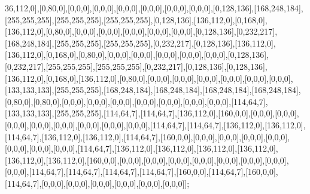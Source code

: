 36,112,0],[0,80,0],[0,0,0],[0,0,0],[0,0,0],[0,0,0],[0,0,0],[0,0,0],[0,128,136],[168,248,184],[255,255,255],[255,255,255],[255,255,255],[0,128,136],[136,112,0],[0,168,0],[136,112,0],[0,80,0],[0,0,0],[0,0,0],[0,0,0],[0,0,0],[0,0,0],[0,128,136],[0,232,217],[168,248,184],[255,255,255],[255,255,255],[0,232,217],[0,128,136],[136,112,0],[136,112,0],[0,168,0],[0,80,0],[0,0,0],[0,0,0],[0,0,0],[0,0,0],[0,0,0],[0,128,136],[0,232,217],[255,255,255],[255,255,255],[0,232,217],[0,128,136],[0,128,136],[136,112,0],[0,168,0],[136,112,0],[0,80,0],[0,0,0],[0,0,0],[0,0,0],[0,0,0],[0,0,0],[0,0,0],[133,133,133],[255,255,255],[168,248,184],[168,248,184],[168,248,184],[168,248,184],[0,80,0],[0,80,0],[0,0,0],[0,0,0],[0,0,0],[0,0,0],[0,0,0],[0,0,0],[0,0,0],[114,64,7],[133,133,133],[255,255,255],[114,64,7],[114,64,7],[136,112,0],[160,0,0],[0,0,0],[0,0,0],[0,0,0],[0,0,0],[0,0,0],[0,0,0],[0,0,0],[0,0,0],[114,64,7],[114,64,7],[136,112,0],[136,112,0],[114,64,7],[136,112,0],[136,112,0],[114,64,7],[160,0,0],[0,0,0],[0,0,0],[0,0,0],[0,0,0],[0,0,0],[0,0,0],[0,0,0],[114,64,7],[136,112,0],[136,112,0],[136,112,0],[136,112,0],[136,112,0],[136,112,0],[160,0,0],[0,0,0],[0,0,0],[0,0,0],[0,0,0],[0,0,0],[0,0,0],[0,0,0],[0,0,0],[114,64,7],[114,64,7],[114,64,7],[114,64,7],[160,0,0],[114,64,7],[160,0,0],[114,64,7],[0,0,0],[0,0,0],[0,0,0],[0,0,0],[0,0,0],[0,0,0]];

